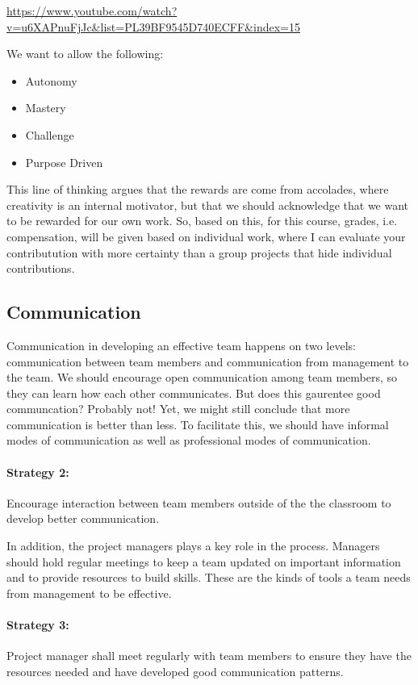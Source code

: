 \documentclass{article}\usepackage[]{graphicx}\usepackage[]{color}
\begin{document}
\url{https://www.youtube.com/watch?v=u6XAPnuFjJc&list=PL39BF9545D740ECFF&index=15}

We want to allow the following: 

\begin{itemize}
  \item Autonomy
  \item Mastery
  \item Challenge
  \item Purpose Driven
\end{itemize}

This line of thinking argues that the rewards are come from accolades, where creativity is an internal motivator, but that we should acknowledge that we want to be rewarded for our own work. So, based on this, for this course, grades, i.e. compensation, will be given based on individual work, where I can evaluate your contributution with more certainty than a group projects that hide individual contributions. 



\subsection{Communication}
Communication in developing an effective team happens on two levels: communication between team members and communication from management to the team. We should encourage open communication among team members, so they can learn how each other communicates. But does this gaurentee good communcation? Probably not!  Yet, we might still conclude that more communication is better than less. To facilitate this, we should have informal modes of communication as well as professional modes of communication. 

\paragraph{Strategy 2:} Encourage interaction between team members outside of the the classroom to develop better communication. 

In addition, the project managers plays a key role in the process. Managers should hold regular meetings to keep a team updated on important information and to provide resources to build skills. These are the kinds of tools a team needs from management to be effective. 

\paragraph{Strategy 3:} Project manager shall meet regularly with team members to ensure they have the resources needed and have developed good communication patterns.
\end{document}

